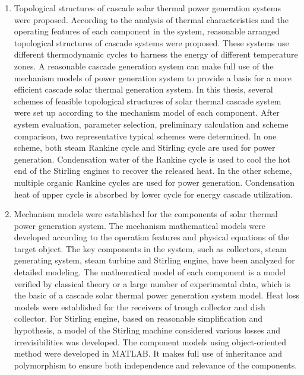 \begin{enumerate}[label=(\arabic*)]
  \item Topological structures of cascade solar thermal power generation systems were proposed. According to the analysis of thermal characteristics and the operating features of each component in the system, reasonable arranged topological structures of cascade systems were proposed. These systems use different thermodynamic cycles to harness the energy of different temperature zones. A reasonable cascade generation system can make full use of the mechanism models of power generation system to provide a basis for a more efficient cascade solar thermal generation system. In this thesis, several schemes of feasible topological structures of solar thermal cascade system were set up according to the mechanism model of each component. After system evaluation, parameter selection, preliminary calculation and scheme comparison, two representative typical schemes were determined. In one scheme, both steam Rankine cycle and Stirling cycle are used for power generation. Condensation water of the Rankine cycle is used to cool the hot end of the Stirling engines to recover the released heat. In the other scheme, multiple organic Rankine cycles are used for power generation. Condensation heat of upper cycle is absorbed by lower cycle for energy cascade utilization.
  \item Mechanism models were established for the components of solar thermal power generation system. The mechanism mathematical models were developed according to the operation features and physical equations of the target object. The key components in the system, such as collectors, steam generating system, steam turbine and Stirling engine, have been analyzed for detailed modeling. The mathematical model of each component is a model verified by classical theory or a large number of experimental data, which is the basic of a cascade solar thermal power generation system model. Heat loss models were established for the receivers of trough collector and dish collector. For Stirling engine, based on reasonable simplification and hypothesis, a model of the Stirling machine considered various losses and irrevisibilities was developed. The component models using object-oriented method were developed in MATLAB. It makes full use of inheritance and polymorphism to ensure both independence and relevance of the components.

\end{enumerate}
